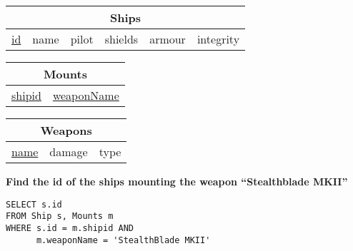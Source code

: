 \documentclass{beamer}
\begin{document}
\begin{frame}[fragile]

\begin{tabular}{|c|c|c|c|c|c|}
\hline
\multicolumn{6}{|c|}{\textbf{Ships}} \\
\hline
\underline{id} & name & pilot & shields & armour & integrity \\
\hline
\end{tabular}

\begin{tabular}{|c|c|}
\hline
\multicolumn{2}{|c|}{\textbf{Mounts}} \\
\hline
\underline{shipid} & \underline{weaponName} \\
\hline
\end{tabular}

\begin{tabular}{|c|c|c|}
\hline
\multicolumn{3}{|c|}{\textbf{Weapons}} \\
\hline
\underline{name} & damage & type \\
\hline
\end{tabular}

\vspace{0.25cm}
\textbf{Find the id of the ships mounting the weapon ``Stealthblade MKII''}
\pause
\begin{lstlisting}[showstringspaces=false]
SELECT s.id
FROM Ship s, Mounts m
WHERE s.id = m.shipid AND 
      m.weaponName = 'StealthBlade MKII'
\end{lstlisting}

\end{frame}
\end{document}
